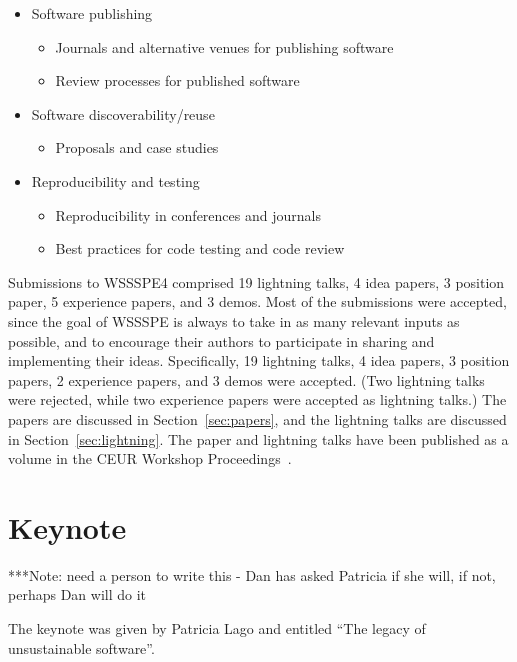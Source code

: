 \documentclass[11pt, oneside]{amsart}
\newcommand{\note}[1]{ {\textcolor{blueish}    { ***Note:      #1 }}}
\begin{document}
\begin{itemize}
\item Software publishing
\begin{itemize}
    \item Journals and alternative venues for publishing software
    \item Review processes for published software
\end{itemize}

\item Software discoverability/reuse
\begin{itemize}
    \item Proposals and case studies
\end{itemize}

\item Reproducibility and testing
\begin{itemize}
    \item Reproducibility in conferences and journals
    \item Best practices for code testing and code review
\end{itemize}

\end{itemize}

Submissions to WSSSPE4 comprised
19 lightning talks,
4 idea papers,
3 position paper,
5 experience papers,
and
3 demos.
Most of the submissions were accepted, since the goal of WSSSPE is always to
take in as many relevant inputs as possible, and to encourage their authors to
participate in sharing and implementing their ideas.
Specifically,
19 lightning talks,
4 idea papers,
3 position papers,
2 experience papers,
and
3 demos
were accepted. (Two lightning talks were rejected, while two experience papers
were accepted as lightning talks.)
The papers are discussed in Section~\ref{sec:papers},
and the lightning talks are discussed in Section~\ref{sec:lightning}.
The paper and lightning talks have been published as a volume in the CEUR Workshop Proceedings~\cite{WSSSPE4-proceedings}.

\section{Keynote}\label{sec:keynote}

\note{need a person to write this - Dan has asked Patricia if she will, if not, perhaps Dan will do it}

The keynote was given by Patricia Lago and entitled ``The legacy of unsustainable software''.
\end{document}
